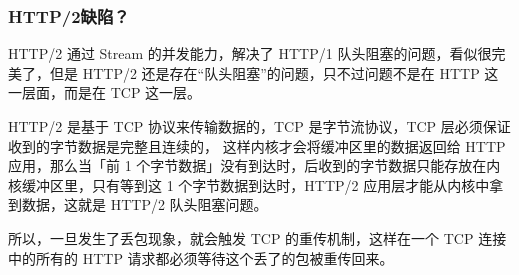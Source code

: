 \documentclass[11pt]{article}
\begin{document}
\subsubsection{HTTP/2缺陷？}
\label{sec:orgcf076ac}
HTTP/2 通过 Stream 的并发能力，解决了 HTTP/1 队头阻塞的问题，看似很完美了，但是 HTTP/2 还是存在“队头阻塞”的问题，只不过问题不是在 HTTP 这一层面，而是在 TCP 这一层。

HTTP/2 是基于 TCP 协议来传输数据的，TCP 是字节流协议，TCP 层必须保证收到的字节数据是完整且连续的，\- 这样内核才会将缓冲区里的数据返回给 HTTP 应用，那么当「前 1 个字节数据」没有到达时，后收到的字节数据只能存放在内核缓冲区里，只有等到这 1 个字节数据到达时，HTTP/2 应用层才能从内核中拿到数据，这就是 HTTP/2 队头阻塞问题。

所以，一旦发生了丢包现象，就会触发 TCP 的重传机制，这样在一个 TCP 连接中的所有的 HTTP 请求都必须等待这个丢了的包被重传回来。
\end{document}
